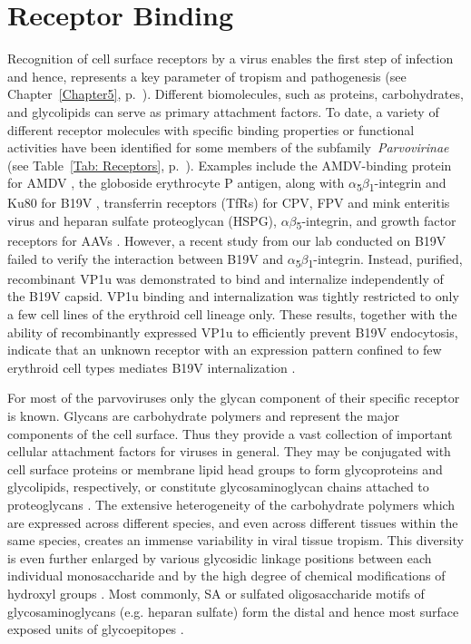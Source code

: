 \section{Receptor Binding}
\label{Binding}
Recognition of cell surface receptors by a virus enables the first step of infection and hence, represents a key parameter of tropism and pathogenesis (see Chapter~\ref{Chapter5}, p.~\pageref{Chapter5}). Different biomolecules, such as proteins, carbohydrates, and glycolipids can serve as primary attachment factors. To date, a variety of different receptor molecules with specific binding properties or functional activities have been identified for some members of the subfamily~\textit{Parvovirinae} (see Table~\ref{Tab: Receptors}, p.~\pageref{Tab: Receptors}). Examples include the AMDV-binding protein for AMDV \cite{pmid10196278}, the globoside erythrocyte P antigen, along with $\alpha$\textsubscript{5}$\beta$\textsubscript{1}-integrin and Ku80 for B19V \cite{pmid8211117, pmid15661151, pmid12907437, pmid16076874, weigel}, transferrin receptors (TfRs) for CPV, FPV and mink enteritis virus \cite{pmid16040076, pmid11264378} and heparan sulfate proteoglycan (HSPG), $\alpha$\textsubscript{}$\beta$\textsubscript{5}-integrin, and growth factor receptors for AAVs \cite{pmid14502277, pmid15596854, pmid9883842, pmid9445046, pmid9883843, pmid8599196}. However, a recent study from our lab conducted on B19V failed to verify the interaction between B19V and $\alpha$\textsubscript{5}$\beta$\textsubscript{1}-integrin. Instead, purified, recombinant VP1u was demonstrated to bind and internalize independently of the B19V capsid. VP1u binding and internalization was tightly restricted to only a few cell lines of the erythroid cell lineage only. These results, together with the ability of recombinantly expressed VP1u to efficiently prevent B19V endocytosis, indicate that an unknown receptor with an expression pattern confined to few erythroid cell types mediates B19V internalization \cite{pmid24067971}.  

For most of the parvoviruses only the glycan component of their specific receptor is known. Glycans are carbohydrate polymers and represent the major components of the cell surface. Thus they provide a vast collection of important cellular attachment factors for viruses in general. They may be conjugated with cell surface proteins or membrane lipid head groups to form glycoproteins and glycolipids, respectively, or constitute glycosaminoglycan chains attached to proteoglycans \cite{pmid16019714}. The extensive heterogeneity of the carbohydrate polymers which are expressed across different species, and even across different tissues within the same species, creates an immense variability in viral tissue tropism. This diversity is even further enlarged by various glycosidic linkage positions between each individual monosaccharide and by the high degree of chemical modifications of hydroxyl groups \cite{pmid11841250, pmid17632542}. Most commonly, SA or sulfated oligosaccharide motifs of glycosaminoglycans (e.g. heparan sulfate) form the distal and hence most surface exposed units of glycoepitopes \cite{pmid17072005}.


